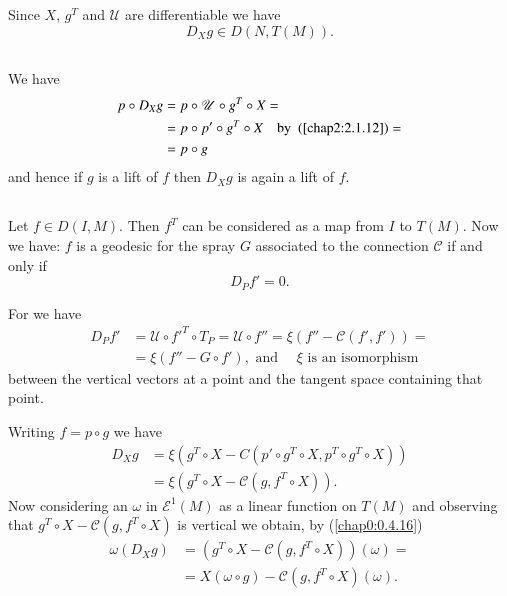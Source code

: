 \setcounter{subsection}{2}
\subsection{}\label{chap2:2.3.3}

\begin{remarks*}
Since $X$, $g^{T}$ and $\mathcal{U}$ are differentiable we have
$$
D_{X}g\in D(N,T(M)).
$$
\end{remarks*}


\subsection{}\label{chap2:2.3.4}

We \pageoriginale have
\begin{align*}
p\circ D_{X}g &= p\circ \mathscr{U}\circ g^{T}\circ X=\\
              &= p\circ p'\circ g^{T}\circ X\quad
                 \text{by \ (\ref{chap2:2.1.12})} =\\
              &= p\circ g
\end{align*}
and hence if $g$ is a lift of $f$ then $D_{X}g$ is again a lift of $f$.

\subsection{}\label{chap2:2.3.5}
Let $f\in D(I,M)$. Then $f^{T}$ can be considered as a map from $I$ to
$T(M)$. Now we have: $f$ is a geodesic for the spray $G$ associated to
the connection $\mathcal{C}$ if and only if 
$$
D_{P}f'=0.
$$

For we have
\begin{align*}
D_{P}f' &= \mathscr{U}\circ {f'}^{T}\circ T_{P}=\mathscr{U}\circ
f''=\xi (f''-\mathcal{C}(f',f'))=\\
        &= \xi (f''-G\circ f'),\text{ \ and \ }\quad \xi \text{ \ is an
  isomorphism}
\end{align*}
between the vertical vectors at a point and the tangent space
containing that point.

Writing $f=p\circ g$ we have
\begin{align*}
D_{X}g &= \xi(g^{T}\circ X-C(p'\circ g^{T}\circ X, p^{T}\circ
g^{T}\circ X))\tag{2.3.6}\label{chap2:2.3.6}\\
       &=\xi(g^{T}\circ X-\mathcal{C}(g,f^{T}\circ X)).
\end{align*}
Now considering an $\omega$ in $\mathcal{E}^{1}(M)$ as a linear
function on $T(M)$ and observing that $g^{T}\circ
X-\mathcal{C}(g,f^{T}\circ X)$ is vertical we obtain, by
(\ref{chap0:0.4.16}) \pageoriginale
\begin{align*}
\omega(D_{X}g) &= (g^{T}\circ X-\mathcal{C}(g,f^{T}\circ
X))(\omega)=\\
               &= X(\omega\circ g)-\mathcal{C}(g,f^{T}\circ
X)(\omega).\tag{2.3.7}\label{chap2:2.3.7} 
\end{align*}

